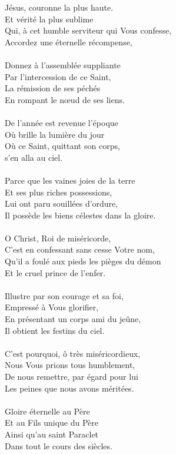 Jésus, couronne la plus haute.\\
Et vérité la plus sublime\\
Qui, à cet humble serviteur qui Vous confesse,\\
Accordez une éternelle récompense,\\
\\
Donnez à l’assemblée suppliante\\
Par l’intercession de ce Saint,\\
La rémission de ses péchés\\
En rompant le nœud de ses liens.\\
\\
De l’année est revenue l’époque\\
Où brille la lumière du jour\\
Où ce Saint, quittant son corps,\\
s'en alla au ciel.\\
\\
Parce que les vaines joies de la terre\\
Et ses plus riches possessions,\\
Lui ont paru souillées d’ordure,\\
Il possède les biens célestes dans la gloire.\\
\\
O Christ, Roi de miséricorde,\\
C’est en confessant sans cesse Votre nom,\\
Qu’il a foulé aux pieds les pièges du démon\\
Et le cruel prince de l’enfer.\\
\\
Illustre par son courage et sa foi,\\
Empressé à Vous glorifier,\\
En présentant un corps ami du jeûne,\\
Il obtient les festins du ciel.\\
\\
C’est pourquoi, ô très miséricordieux,\\
Nous Vous prions tous humblement,\\
De nous remettre, par égard pour lui\\
Les peines que nous avons méritées.\\
\\
Gloire éternelle au Père\\
Et au Fils unique du Père\\
Ainsi qu’au saint Paraclet\\
Dans tout le cours des siècles.